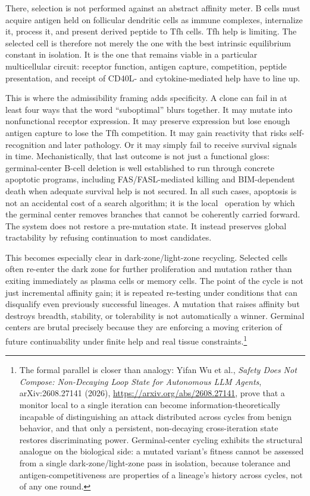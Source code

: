 \documentclass[11pt]{article}
\begin{document}
There, selection is not performed against an abstract affinity meter. B cells must acquire antigen held on follicular dendritic cells as immune complexes, internalize it, process it, and present derived peptide to Tfh cells. Tfh help is limiting. The selected cell is therefore not merely the one with the best intrinsic equilibrium constant in isolation. It is the one that remains viable in a particular multicellular circuit: receptor function, antigen capture, competition, peptide presentation, and receipt of CD40L- and cytokine-mediated help have to line up.

This is where the admissibility framing adds specificity. A clone can fail in at least four ways that the word ``suboptimal'' blurs together. It may mutate into nonfunctional receptor expression. It may preserve expression but lose enough antigen capture to lose the Tfh competition. It may gain reactivity that risks self-recognition and later pathology. Or it may simply fail to receive survival signals in time. Mechanistically, that last outcome is not just a functional gloss: germinal-center B-cell deletion is well established to run through concrete apoptotic programs, including FAS/FASL-mediated killing and BIM-dependent death when adequate survival help is not secured. In all such cases, apoptosis is not an accidental cost of a search algorithm; it is the local \repair\ operation by which the germinal center removes branches that cannot be coherently carried forward. The system does not restore a pre-mutation state. It instead preserves global tractability by refusing continuation to most candidates.

This becomes especially clear in dark-zone/light-zone recycling. Selected cells often re-enter the dark zone for further proliferation and mutation rather than exiting immediately as plasma cells or memory cells. The point of the cycle is not just incremental affinity gain; it is repeated re-testing under conditions that can disqualify even previously successful lineages. A mutation that raises affinity but destroys breadth, stability, or tolerability is not automatically a winner. Germinal centers are brutal precisely because they are enforcing a moving criterion of future continuability under finite help and real tissue constraints.\footnote{The formal parallel is closer than analogy: Yifan Wu et al., \emph{Safety Does Not Compose: Non-Decaying Loop State for Autonomous LLM Agents}, arXiv:2608.27141 (2026), \url{https://arxiv.org/abs/2608.27141}, prove that a monitor local to a single iteration can become information-theoretically incapable of distinguishing an attack distributed across cycles from benign behavior, and that only a persistent, non-decaying cross-iteration state restores discriminating power. Germinal-center cycling exhibits the structural analogue on the biological side: a mutated variant's fitness cannot be assessed from a single dark-zone/light-zone pass in isolation, because tolerance and antigen-competitiveness are properties of a lineage's history across cycles, not of any one round.}
\end{document}
